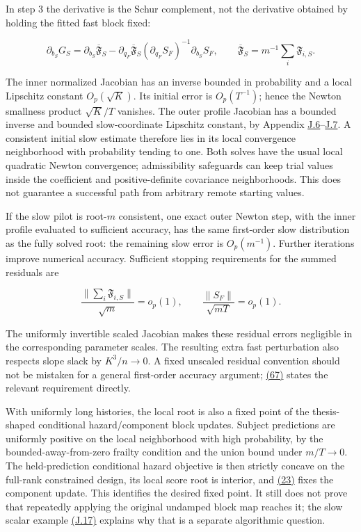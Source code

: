 \documentclass[11pt]{article}
\begin{document}
In step 3 the derivative is the Schur complement, not the derivative obtained by holding the fitted fast block fixed:

\begin{equation*}
\partial_{b_S}G_S
 =\partial_{b_S}\overline{\mathfrak F}_S
  -\partial_{q_F}\overline{\mathfrak F}_S
     (\partial_{q_F}S_F)^{-1}\partial_{b_S}S_F,
\qquad \overline{\mathfrak F}_S=m^{-1}\sum_i\mathfrak F_{i,S}.
\tag{66}\label{eq:66}
\end{equation*}

The inner normalized Jacobian has an inverse bounded in probability and a local Lipschitz constant \(O_p(\sqrt K)\). Its initial error is \(O_p(T^{-1})\); hence the Newton smallness product \(\sqrt K/T\) vanishes. The outer profile Jacobian has a bounded inverse and bounded slow-coordinate Lipschitz constant, by Appendix \hyperref[sec:J.6]{J.6}--\hyperref[sec:J.7]{J.7}. A consistent initial slow estimate therefore lies in its local convergence neighborhood with probability tending to one. Both solves have the usual local quadratic Newton convergence; admissibility safeguards can keep trial values inside the coefficient and positive-definite covariance neighborhoods. This does not guarantee a successful path from arbitrary remote starting values.

If the slow pilot is root-\(m\) consistent, one exact outer Newton step, with the inner profile evaluated to sufficient accuracy, has the same first-order slow distribution as the fully solved root: the remaining slow error is \(O_p(m^{-1})\). Further iterations improve numerical accuracy. Sufficient stopping requirements for the summed residuals are

\begin{equation*}
\frac{\|\sum_i\mathfrak F_{i,S}\|}{\sqrt m}=o_p(1),\qquad
\frac{\|S_F\|}{\sqrt{mT}}=o_p(1).
\tag{67}\label{eq:67}
\end{equation*}

The uniformly invertible scaled Jacobian makes these residual errors negligible in the corresponding parameter scales. The resulting extra fast perturbation also respects slope slack by \(K^3/n\to0\). A fixed unscaled residual convention should not be mistaken for a general first-order accuracy argument; \hyperref[eq:67]{(67)} states the relevant requirement directly.

With uniformly long histories, the local root is also a fixed point of the thesis-shaped conditional hazard/component block updates. Subject predictions are uniformly positive on the local neighborhood with high probability, by the bounded-away-from-zero frailty condition and the union bound under \(m/T\to0\). The held-prediction conditional hazard objective is then strictly concave on the full-rank constrained design, its local score root is interior, and \hyperref[eq:23]{(23)} fixes the component update. This identifies the desired fixed point. It still does not prove that repeatedly applying the original undamped block map reaches it; the slow scalar example \hyperref[eq:J.17]{(J.17)} explains why that is a separate algorithmic question.
\end{document}
